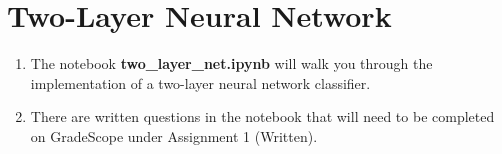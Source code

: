 \section{Two-Layer Neural Network}

\begin{enumerate}
    \item {} The notebook \textbf{two\_layer\_net.ipynb} will walk you through the implementation of a two-layer neural network classifier.
    \item {} There are written questions in the notebook that will need to be completed on GradeScope under Assignment 1 (Written).
\end{enumerate}
